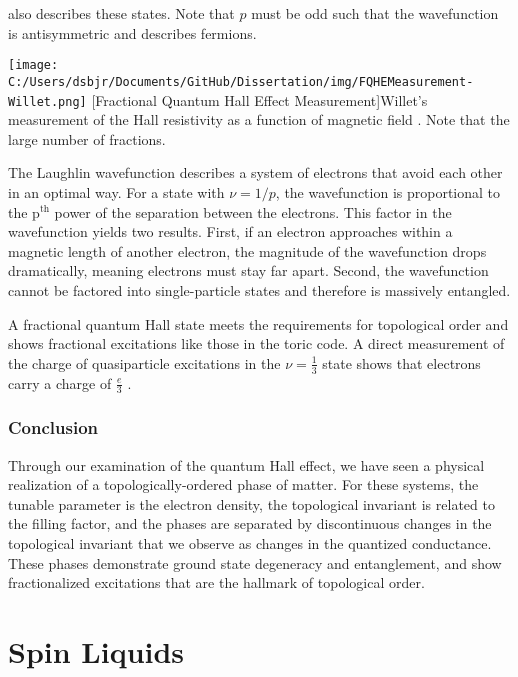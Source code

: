 also describes these states. Note that $p$ must be odd such that the wavefunction is antisymmetric and describes fermions.

\begin{centering}
\texttt{[image: C:/Users/dsbjr/Documents/GitHub/Dissertation/img/FQHEMeasurement-Willet.png]}
  \captionsetup{width=0.75\textwidth}
  [Fractional Quantum Hall Effect Measurement]{Willet's measurement of the Hall resistivity as a function of magnetic field \cite{Willet1987}. Note that the large number of fractions.}
  \label{fig:FQHE1}
\end{centering}

The Laughlin wavefunction describes a system of electrons that avoid each other in an optimal way. For a state with $\nu = 1/p$, the wavefunction is proportional to the p$^{\text{th}}$ power of the separation between the electrons. This factor in the wavefunction yields two results. First, if an electron approaches within a magnetic length of another electron, the magnitude of the wavefunction drops dramatically, meaning electrons must stay far apart. Second, the wavefunction cannot be factored into single-particle states and therefore is massively entangled.

A fractional quantum Hall state meets the requirements for topological order and shows fractional excitations like those in the toric code. A direct measurement of the charge of quasiparticle excitations in the $\nu=\frac{1}{3}$ state shows that electrons carry a charge of $\frac{e}{3}$ \cite{Goldman1995}.

\subsubsection{Conclusion}

Through our examination of the quantum Hall effect, we have seen a physical realization of a topologically-ordered phase of matter.  For these systems, the tunable parameter is the electron density, the topological invariant is related to the filling factor, and the phases are separated by discontinuous changes in the topological invariant that we observe as changes in the quantized conductance. These phases demonstrate ground state degeneracy and entanglement, and show fractionalized excitations that are the hallmark of topological order.

\section{Spin Liquids}


